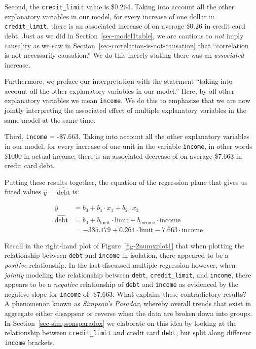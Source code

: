 \documentclass[
  letterpaper,
  DIV=11,
  numbers=noendperiod]{scrreprt}
\theoremstyle{definition}
\theoremstyle{remark}
\begin{document}
Second, the \texttt{credit\_limit} value is \$0.264. Taking into account
all the other explanatory variables in our model, for every increase of
one dollar in \texttt{credit\_limit}, there is an associated increase of
on average \$0.26 in credit card debt. Just as we did in
Section~\ref{sec-model1table}, we are cautious to \emph{not} imply
causality as we saw in Section~\ref{sec-correlation-is-not-causation}
that ``correlation is not necessarily causation.'' We do this merely
stating there was an \emph{associated} increase.

Furthermore, we preface our interpretation with the statement ``taking
into account all the other explanatory variables in our model.'' Here,
by all other explanatory variables we mean \texttt{income}. We do this
to emphasize that we are now jointly interpreting the associated effect
of multiple explanatory variables in the same model at the same time.

Third, \texttt{income} = -\$7.663. Taking into account all the other
explanatory variables in our model, for every increase of one unit in
the variable \texttt{income}, in other words \$1000 in actual income,
there is an associated decrease of on average \$7.663 in credit card
debt.

Putting these results together, the equation of the regression plane
that gives us fitted values \(\widehat{y}\) = \(\widehat{\text{debt}}\)
is:

\[
\begin{aligned}
\widehat{y} &= b_0 + b_1 \cdot x_1 +  b_2 \cdot x_2\\
\widehat{\text{debt}} &= b_0 + b_{\text{limit}} \cdot \text{limit} + b_{\text{income}} \cdot \text{income}\\
&= -385.179 + 0.264 \cdot\text{limit} - 7.663 \cdot\text{income}
\end{aligned}
\]

Recall in the right-hand plot of Figure~\ref{fig-2numxplot1} that when
plotting the relationship between \texttt{debt} and \texttt{income} in
isolation, there appeared to be a \emph{positive} relationship. In the
last discussed multiple regression however, when \emph{jointly} modeling
the relationship between \texttt{debt}, \texttt{credit\_limit}, and
\texttt{income}, there appears to be a \emph{negative} relationship of
\texttt{debt} and \texttt{income} as evidenced by the negative slope for
\texttt{income} of -\$7.663. What explains these contradictory results?
A phenomenon known as \emph{Simpson's Paradox},
whereby overall trends that exist in aggregate either disappear or
reverse when the data are broken down into groups. In
Section~\ref{sec-simpsonsparadox} we elaborate on this idea by looking
at the relationship between \texttt{credit\_limit} and credit card
\texttt{debt}, but split along different \texttt{income} brackets.
\end{document}

